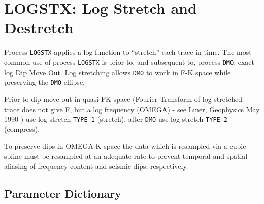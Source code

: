 \section{LOGSTX: Log Stretch and Destretch}
\label{cmd_logstx}

Process \texttt{LOGSTX} applies a log function to ``stretch'' each trace in time.
The most common use of process \texttt{LOGSTX} is prior to, and subsequent to,
process \texttt{DMO}, exact log Dip Move Out.  Log stretching allows \texttt{DMO} to work
in F-K space while preserving the \texttt{DMO} ellipse.

Prior to dip move out in quasi-FK space (Fourier Transform of log
stretched trace does not give F, but a log frequency (OMEGA) - see Liner,
Geophysics May 1990 \cite{Liner1990}) use log stretch \texttt{TYPE 1} (stretch), after \texttt{DMO} use log
stretch \texttt{TYPE 2} (compress).

To preserve dips in OMEGA-K space the data which is resampled via a
cubic spline must be resampled at an adequate rate to prevent temporal
and spatial aliasing of frequency content and seismic dips, respectively.

\subsection{Parameter Dictionary}

